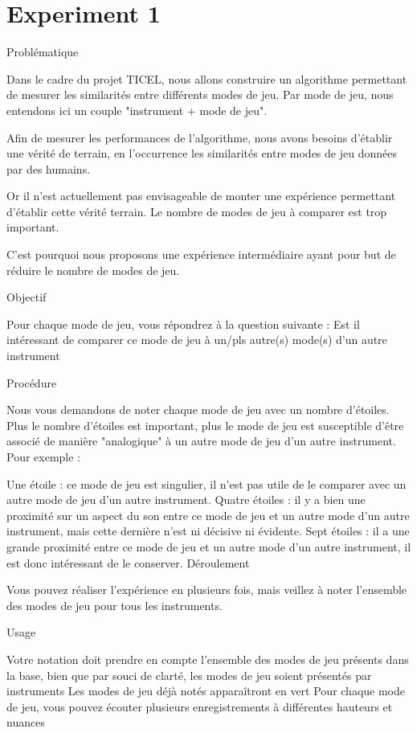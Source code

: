 \documentclass{article}
\begin{document}
\section{Experiment 1}\label{sec:}

Problématique

Dans le cadre du projet TICEL, nous allons construire un algorithme permettant de mesurer les similarités entre différents modes de jeu. Par mode de jeu, nous entendons ici un couple "instrument + mode de jeu".

Afin de mesurer les performances de l'algorithme, nous avons besoins d'établir une vérité de terrain, en l’occurrence les similarités entre modes de jeu données par des humains.

Or il n'est actuellement pas envisageable de monter une expérience permettant d'établir cette vérité terrain. Le nombre de modes de jeu à comparer est trop important.

C'est pourquoi nous proposons une expérience intermédiaire ayant pour but de réduire le nombre de modes de jeu.

Objectif

Pour chaque mode de jeu, vous répondrez à la question suivante : Est il intéressant de comparer ce mode de jeu à un/pls autre(s) mode(s) d'un autre instrument

Procédure

Nous vous demandons de noter chaque mode de jeu avec un nombre d’étoiles. Plus le nombre d'étoiles est important, plus le mode de jeu est susceptible d'être associé de manière "analogique" à un autre mode de jeu d'un autre instrument. Pour exemple :

Une étoile : ce mode de jeu est singulier, il n’est pas utile de le comparer avec un autre mode de jeu d'un autre instrument.
Quatre étoiles : il y a bien une proximité sur un aspect du son entre ce mode de jeu et un autre mode d'un autre instrument, mais cette dernière n'est ni décisive ni évidente.
Sept étoiles : il a une grande proximité entre ce mode de jeu et un autre mode d'un autre instrument, il est donc intéressant de le conserver.
Déroulement

Vous pouvez réaliser l'expérience en plusieurs fois, mais veillez à noter l'ensemble des modes de jeu pour tous les instruments.

Usage

Votre notation doit prendre en compte l'ensemble des modes de jeu présents dans la base, bien que par souci de clarté, les modes de jeu soient présentés par instruments
Les modes de jeu déjà notés apparaîtront en vert
Pour chaque mode de jeu, vous pouvez écouter plusieurs enregistrements à différentes hauteurs et nuances
\end{document}
